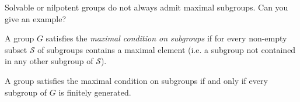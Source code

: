 Solvable or nilpotent groups do not always admit maximal subgroups. Can you give an example?

\begin{definition}
A group $G$ satisfies the \emph{maximal condition on subgroups} if
for every non-empty subset $\mathcal{S}$ of subgroups contains a maximal 
element (i.e. a subgroup not contained in any other subgroup of $\mathcal{S}$). 
\end{definition}


\begin{exercise}
\label{xca:MAX=fg}
A group satisfies the maximal condition on subgroups if and only if
every subgroup of $G$ is finitely generated. 
\end{exercise}



